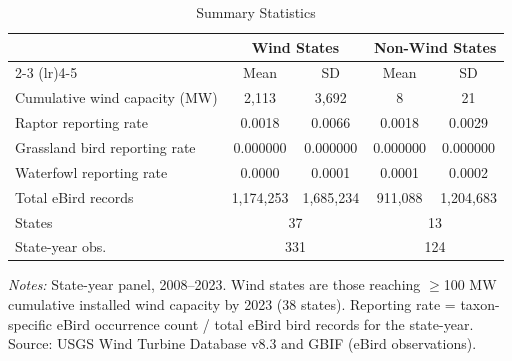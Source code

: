 \begin{table}[htbp]
\centering
\caption{Summary Statistics}
\label{tab:sumstats}
\begin{tabular}{lcccc}
\hline\hline
 & \multicolumn{2}{c}{Wind States} & \multicolumn{2}{c}{Non-Wind States} \\
\cmidrule(lr){2-3} \cmidrule(lr){4-5}
 & Mean & SD & Mean & SD \\
\hline
Cumulative wind capacity (MW) & 2,113 & 3,692 & 8 & 21 \\
Raptor reporting rate & 0.0018 & 0.0066 & 0.0018 & 0.0029 \\
Grassland bird reporting rate & 0.000000 & 0.000000 & 0.000000 & 0.000000 \\
Waterfowl reporting rate & 0.0000 & 0.0001 & 0.0001 & 0.0002 \\
Total eBird records & 1,174,253 & 1,685,234 & 911,088 & 1,204,683 \\
\hline
States & \multicolumn{2}{c}{37} & \multicolumn{2}{c}{13} \\
State-year obs. & \multicolumn{2}{c}{331} & \multicolumn{2}{c}{124} \\
\hline\hline
\end{tabular}
\begin{tablenotes}[flushleft]\footnotesize
\item \textit{Notes:} State-year panel, 2008--2023. Wind states are those reaching $\geq$100 MW cumulative installed wind capacity by 2023 (38 states). Reporting rate = taxon-specific eBird occurrence count / total eBird bird records for the state-year. Source: USGS Wind Turbine Database v8.3 and GBIF (eBird observations).
\end{tablenotes}
\end{table}
